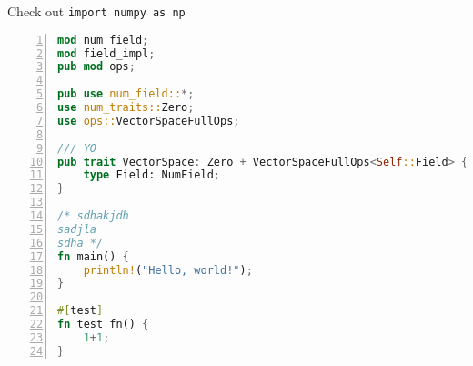 \documentclass[12pt]{article}
\begin{document}
%
%
%
%
%
%
Check out \lstinline[style=python]{import numpy as np}

\begin{lstlisting}[language=Rust, numbers=left, morekeywords={Field}]
mod num_field;
mod field_impl;
pub mod ops;

pub use num_field::*;
use num_traits::Zero;
use ops::VectorSpaceFullOps;

/// YO
pub trait VectorSpace: Zero + VectorSpaceFullOps<Self::Field> {
	type Field: NumField;
}

/* sdhakjdh
sadjla
sdha */
fn main() {
	println!("Hello, world!");
}

#[test]
fn test_fn() {
	1+1;
}

\end{lstlisting}



\end{document}
